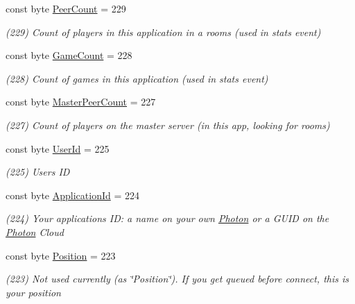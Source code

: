\begin{DoxyCompactItemize}
const byte \hyperlink{class_exit_games_1_1_client_1_1_photon_1_1_parameter_code_ace022047377b9cce0b571defc06a021e}{Peer\+Count} = 229
\begin{DoxyCompactList}\small\item\em (229) Count of players in this application in a rooms (used in stats event)\end{DoxyCompactList}\item 
const byte \hyperlink{class_exit_games_1_1_client_1_1_photon_1_1_parameter_code_af1c484be2b1e6474d46204e7cc7b6fde}{Game\+Count} = 228
\begin{DoxyCompactList}\small\item\em (228) Count of games in this application (used in stats event)\end{DoxyCompactList}\item 
const byte \hyperlink{class_exit_games_1_1_client_1_1_photon_1_1_parameter_code_a362ac423e3572752f5b8b29270d059c8}{Master\+Peer\+Count} = 227
\begin{DoxyCompactList}\small\item\em (227) Count of players on the master server (in this app, looking for rooms)\end{DoxyCompactList}\item 
const byte \hyperlink{class_exit_games_1_1_client_1_1_photon_1_1_parameter_code_a661b2eb09801e8a113253f52615bcb00}{User\+Id} = 225
\begin{DoxyCompactList}\small\item\em (225) User\textquotesingle{}s ID\end{DoxyCompactList}\item 
const byte \hyperlink{class_exit_games_1_1_client_1_1_photon_1_1_parameter_code_a705a32c44b18fe1c8d700c90ecbd03df}{Application\+Id} = 224
\begin{DoxyCompactList}\small\item\em (224) Your application\textquotesingle{}s ID\+: a name on your own \hyperlink{namespace_exit_games_1_1_client_1_1_photon}{Photon} or a G\+U\+ID on the \hyperlink{namespace_exit_games_1_1_client_1_1_photon}{Photon} Cloud\end{DoxyCompactList}\item 
const byte \hyperlink{class_exit_games_1_1_client_1_1_photon_1_1_parameter_code_ad01a54fbf9cfe164bab3b2d3fae052f3}{Position} = 223
\begin{DoxyCompactList}\small\item\em (223) Not used currently (as \char`\"{}\+Position\char`\"{}). If you get queued before connect, this is your position\end{DoxyCompactList}\item 

\end{DoxyCompactItemize}

